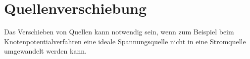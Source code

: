 



\section{Quellenverschiebung}
Das Verschieben von Quellen kann notwendig sein, wenn zum Beispiel beim Knotenpotentialverfahren eine ideale Spannungsquelle nicht in eine Stromquelle umgewandelt werden kann. 

